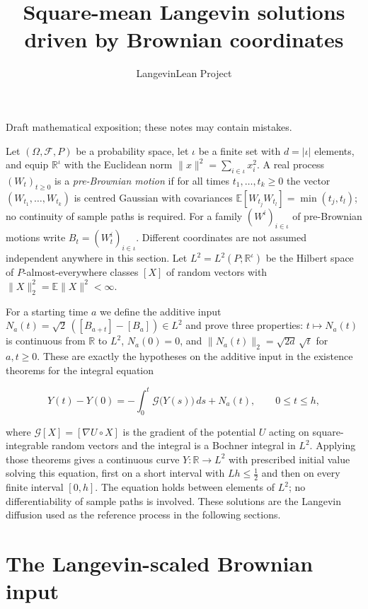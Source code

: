 \documentclass[11pt,a4paper]{article}
\title{\texorpdfstring{Square-mean Langevin solutions driven by Brownian coordinates}{Square-mean Langevin solutions driven by Brownian coordinates}}
\author{LangevinLean Project}
\date{}
\begin{document}
\maketitle
Draft mathematical exposition; these notes may contain mistakes.


Let \((\Omega,\mathcal F,P)\) be a probability space, let \(\iota\) be a finite set with \(d=|\iota|\) elements, and equip \(\mathbb R^\iota\) with the Euclidean norm \(\|x\|^2=\sum_{i\in\iota}x_i^2\). A real process \((W_t)_{t\ge0}\) is a \emph{pre-Brownian motion} if for all times \(t_1,\dots,t_k\ge0\) the vector \((W_{t_1},\dots,W_{t_k})\) is centred Gaussian with covariances \(\mathbb E[W_{t_j}W_{t_l}]=\min(t_j,t_l)\); no continuity of sample paths is required. For a family \((W^i)_{i\in\iota}\) of pre-Brownian motions write \(B_t=(W^i_t)_{i\in\iota}\). Different coordinates are not assumed independent anywhere in this section. Let \(L^2=L^2(P;\mathbb R^\iota)\) be the Hilbert space of \(P\)-almost-everywhere classes \([X]\) of random vectors with \(\|X\|_2^2=\mathbb E\|X\|^2<\infty\).




For a starting time \(a\) we define the additive input \(N_a(t)=\sqrt2\,([B_{a+t}]-[B_a])\in L^2\) and prove three properties: \(t\mapsto N_a(t)\) is continuous from \(\mathbb R\) to \(L^2\), \(N_a(0)=0\), and \(\|N_a(t)\|_2=\sqrt{2d}\,\sqrt t\) for \(a,t\ge0\). These are exactly the hypotheses on the additive input in the existence theorems for the integral equation


\[Y(t)-Y(0)=-\int_0^t\mathcal G\bigl(Y(s)\bigr)\,ds+N_a(t),\qquad 0\le t\le h,\]


where \(\mathcal G[X]=[\nabla U\circ X]\) is the gradient of the potential \(U\) acting on square-integrable random vectors and the integral is a Bochner integral in \(L^2\). Applying those theorems gives a continuous curve \(Y:\mathbb R\to L^2\) with prescribed initial value solving this equation, first on a short interval with \(Lh\le\tfrac12\) and then on every finite interval \([0,h]\). The equation holds between elements of \(L^2\); no differentiability of sample paths is involved. These solutions are the Langevin diffusion used as the reference process in the following sections.


\section{\texorpdfstring{The Langevin-scaled Brownian input}{The Langevin-scaled Brownian input}}
\end{document}

